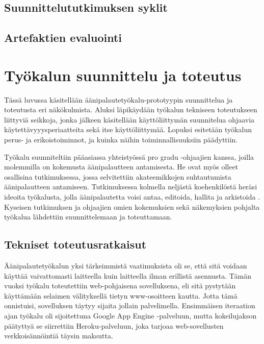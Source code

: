 \documentclass[utf8]{gradu3}
\begin{document}
\section{Suunnittelututkimuksen syklit}

\section{Artefaktien evaluointi}


\chapter{Työkalun suunnittelu ja toteutus}

Tässä luvussa käsitellään äänipalautetyökalu-prototyypin suunnittelua ja toteutusta eri näkökulmista. Aluksi läpikäydään työkalun tekniseen toteutukseen liittyviä seikkoja, jonka jälkeen käsitellään käyttöliittymän suunnitelua ohjaavia käytettävyyysperiaatteita sekä itse käyttöliittymää. Lopuksi esitetään työkalun perus- ja erikoistoiminnot, ja kuinka näihin toiminnallisuuksiin päädyttiin.

Työkalu suunniteltiin pääasiassa yhteistyössä pro gradu -ohjaajien kanssa, joilla molemmilla on kokemusta äänipalautteen antamisesta. He ovat myös olleet osallisina tutkimuksessa, jossa selvitettiin akateemikkojen suhtautumista äänipalautteen antamiseen. Tutkimuksessa kolmella neljästä koehenkilöstä heräsi ideoita työkalusta, jolla äänipalautetta voisi antaa, editoida, hallita ja arkistoida \parencite[][]{academics}. Kyseisen tutkimuksen ja ohjaajien omien kokemuksien sekä näkemyksien pohjalta työkalua lähdettiin suunnittelemaan ja toteuttamaan.

\section{Tekniset toteutusratkaisut}

Äänipalautetyökalun yksi tärkeimmistä vaatimuksista oli se, että sitä voidaan käyttää vaivattomasti laitteella kuin laitteella ilman erillistä asennusta. Tämän vuoksi työkalu toteutettiin web-pohjaisena sovelluksena, eli sitä pystytään käyttämään selaimen välityksellä tietyn www-osoitteen kautta. Jotta tämä onnistuisi, sovelluksen täytyy sijaita jollain palvelimella. Ensimmäisen iteraation ajan työkalu oli sijoitettuna Google App Engine -palveluun, mutta kokeilujakson päätyttyä se siirrettiin Heroku-palveluun, joka tarjoaa web-sovellusten verkkoisännöintiä täysin maksutta. 
\end{document}
